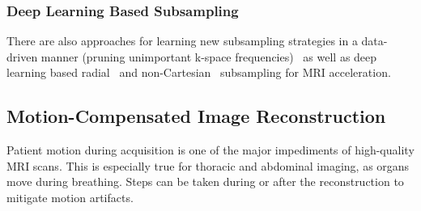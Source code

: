\subsubsection{Deep Learning Based Subsampling} \label{SubSubSec:DeepLearningBasedSubsampling}
There are also approaches for learning new subsampling strategies in a data-driven manner (pruning unimportant k-space frequencies)~\cite{MRISubsamplingPruning} as well as deep learning based radial~\cite{DeepMRIReconstructionRadialSubsampling} and non-Cartesian~\cite{DeepMRIReconstructionSubsampling} subsampling for MRI acceleration.


\subsection{Motion-Compensated Image Reconstruction} \label{SubSec:Motion-CompensatedReconstruction}
Patient motion during acquisition is one of the major impediments of high-quality MRI scans. This is especially true for thoracic and abdominal imaging, as organs move during breathing. Steps can be taken during or after the reconstruction to mitigate motion artifacts.

